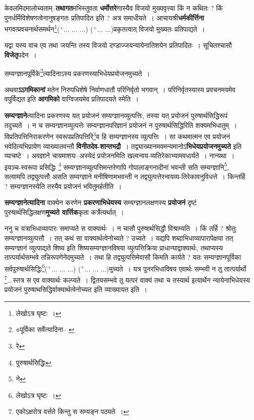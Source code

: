 \documentclass[article,12pt,a4paper]{memoir}
\newcommand{\add}[1]{($^{+}$#1)}
\begin{document}
	  \pstart केवलमिदमालोच्यताम्--\textbf{तथागत}मभिस्तुवता \textbf{धर्मोत्तरे}णास्यैव विजयो मुख्यवृत्त्या किं न कथितः ? किं पुनर्धर्मिविशेषणत्वेनानुषङ्गतः प्रतिपादित इति ? अत्र समाधीयते । आचायश्री\textbf{धर्मकीर्त्तिना} भगवत्प्रवचनार्थसमर्थन\footnote{लेखोऽत्र घृष्टः ।}\add{... ... ...} \add{... ...}प्रकृतत्वात् विजयो मुख्यतः प्रतिपाद्यते ।
	\pend
      

	  \pstart यद्वा यस्य वाच एव तथा जयन्ति तस्य विजयो दण्डाज्जयन्यायेनातिशयेन प्रतिपादितः । सूचितश्चासौ \textbf{विजेतृ}पदेन ।
	\pend
      \leavevmode{}
	  \bigskip
	  \begingroup
	

	  \pstart सम्यग्ज्ञानपूर्विके\footnote{०पूर्विका सर्वेत्यादिना--\cite{dp-msA} \cite{dp-edP} \cite{dp-edE}}त्यादिनाऽस्य प्रकरणस्याभिधेयप्रयोजनमुच्यते ।
	\pend
      
	  \endgroup
	

	  \pstart अथवा\textbf{ऽऽगमिकानां} मतेन निरुपधिशेषे निर्वाणधातौ परिनिर्वृतो भगवान् । परिनिर्वृतस्यास्य प्रवचनमयमेव वपुर्विद्यत इति \textbf{आगमिको} वाग्विजयमेव प्रतिपादयते स्मेति ।
	\pend
      

	  \pstart \textbf{सम्यग्ज्ञाने}त्यादिना प्रकरणस्य यत् प्रयोजनं सम्यग्ज्ञानव्युत्पत्तिः, तस्या यत् प्रयोजनं पुरुषार्थसिद्धिरूपं तदुच्यते । न च सम्यग्ज्ञानव्युत्पत्तेः सम्यग्ज्ञानपरिज्ञानं प्रयोजनं न पुरुषार्थसिद्धिरिति शक्यमभिधातुम् । विप्रतिपत्तिनिराकरणेन स्वरूपप्रतिपत्तिरि\footnote{रे}व हि सम्यग्ज्ञानस्य व्युत्पत्तिः । सा कथमात्मन एव प्रयोजनं भवेदित्यभिप्रायेण व्याख्यातवन्तौ \textbf{विनीतदेव-शान्तभद्रौ} । तद्व्याख्यानमवमन्यमानोऽ\textbf{भिधेयप्रयोजनमुच्यते} इति व्याचष्टे । अवज्ञाने चायमाशयः--अस्येदं प्रयोजनमिति खल्वन्वय-व्यतिरेकाभ्यामवधार्यते । नान्यथा । इयञ्च-स्वरूपा प्रसिद्धिः \footnote{पुरुषार्थसिद्धिः} सम्यग्ज्ञानव्युत्पत्तिमन्तरेणापि गोपालाङ्गनादीनां भवन्ती सति सम्यग्ज्ञानि\footnote{ने}, सत्यामपि तद्व्युत्पत्तौ असति सम्यग्ज्ञाने मनीषिणामभवन्ती न तद्व्युत्पत्तेरन्वयव्य-तिरेकावनुविधत्ते । किन्तर्हि ? सम्यग्ज्ञानस्येति तस्यैव प्रयोजनं भवितुमर्हतीति ।
	\pend
      

	  \pstart \textbf{सम्यग्ज्ञानेत्यादिना} वाक्येन करणेन \textbf{प्रकरणाभिधेयस्य} सम्यग्ज्ञानलक्षणस्य \textbf{प्रयोजनं} दृष्टं पुरुषार्थसिद्धिलक्षण\textbf{मुच्यते वार्त्तिक}कृता कर्त्रेत्यर्थात् ।
	\pend
      

	  \pstart ननु च यत्राभिधाव्यापारः समाप्यते स वाक्यार्थः । न चासौ पुरुषार्थसिद्धौ विश्राम्यति । किं तर्हि ? श्रोतुः सम्यग्ज्ञानव्युत्पत्तौ । तत् कथं सा वाक्यार्थत्वेनोच्यते ? उच्यते । यद्यपि शब्दाभिधाव्यापारापेक्षया तत् सम्यग्ज्ञानं व्युत्पाद्यते शिष्य इति शिष्यसम्यग्ज्ञानविषया व्युत्पत्तिक्रिया प्राधान्याद्वाक्यार्थः, तथाप्यस्य तात्पर्यार्थसम्भवे तन्निरूपणेनेदमुच्यते । तथा हि तद्व्युत्पत्तिमेवासौ किमति कार्यते ? यतः सम्यग्ज्ञानपूर्विका सर्वपुरुषार्थसिद्धिः\footnote{लेखोऽत्र घृष्टः ।}\add{... ... ...} \add{... ... ...}मुच्यते । यत्र पुनरभिधाविषय एवार्थः सम्भवी न तु तात्पर्यार्थो \leavevmode{}\footnote{एकोऽक्षरोत्र वर्त्तते किन्तु स सम्यङ्न पठ्यते ।}...स्तत्र स एव वाक्यार्थः कल्प्यते । द्वितयसम्भवे तु यत्परं वाक्यं तथा च तस्यार्थ इत्यार्थेन न्यायेनाभिधेयस्य प्रयोजनं पुरुषाथसिद्धिर्वाक्यार्थत्वेनोच्यत इति व्याख्यायत इति ।
	\pend
      
\end{document}
